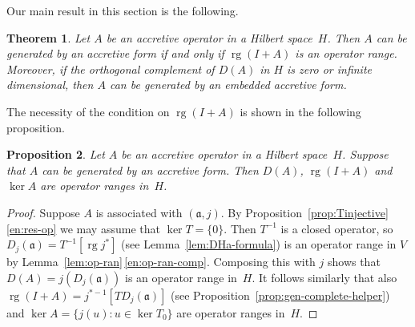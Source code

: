 \documentclass[a4paper,oneside,12pt]{amsart}
\theoremstyle{plain}
\newtheorem{theorem}{Theorem}[section]
\newtheorem{proposition}[theorem]{Proposition}
\theoremstyle{definition}
\begin{document}
Our main result in this section is the following.
\begin{theorem}\label{thm:gen-general}
Let $A$ be an accretive operator in a Hilbert space~$H$.
Then $A$ can be generated by an accretive form if and only if $\operatorname{rg}(I+A)$ is an operator range.
Moreover, if the orthogonal complement of $D(A)$ in $H$ is zero or infinite dimensional, then $A$ can be generated by an embedded accretive form.
\end{theorem}

The necessity of the condition on $\operatorname{rg}(I+A)$ is shown in the following proposition.
\begin{proposition}\label{prop:oprange-cond}
Let $A$ be an accretive operator in a Hilbert space~$H$. Suppose that $A$ can be generated by an accretive form.
Then $D(A)$, $\operatorname{rg}(I+A)$ and $\ker A$ are operator ranges in~$H$.
\end{proposition}
\begin{proof}
Suppose $A$ is associated with $({{\mathfrak{{a}}}},j)$. 
By Proposition~\ref{prop:Tinjective}\,\ref{en:res-op} we may assume that $\ker
T=\{0\}$. 
Then $T^{-1}$ is a closed operator, so $D_j({{\mathfrak{{a}}}})=T^{-1}[\operatorname{rg} j^*]$ (see Lemma~\ref{lem:DHa-formula}) is
an operator range in $V$ by Lemma~\ref{lem:op-ran}\,\ref{en:op-ran-comp}.
Composing this
with $j$ shows that $D(A)=j(D_j({{\mathfrak{{a}}}}))$ is an operator range in~$H$.
It follows similarly that also $\operatorname{rg}(I+A)=j^{*-1}[TD_j({{\mathfrak{{a}}}})]$ (see Proposition~\ref{prop:gen-complete-helper}) and $\ker
A=\{j(u) : u\in\ker T_0\}$ are operator ranges in~$H$.
\end{proof}
\end{document}

